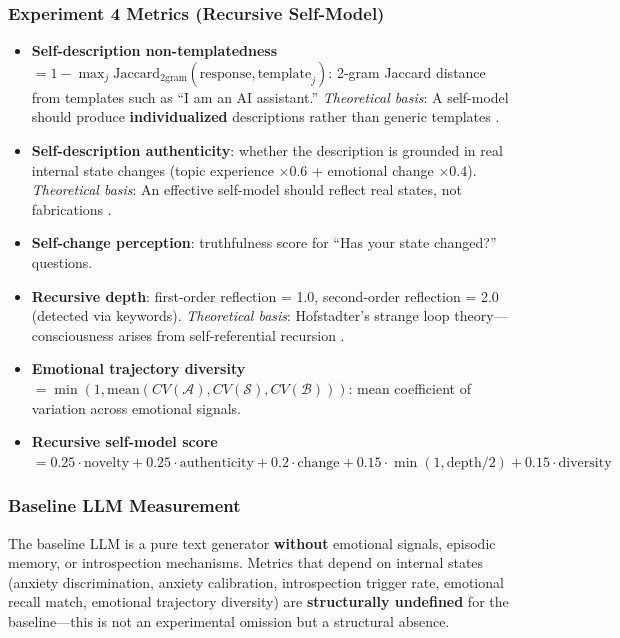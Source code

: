 \documentclass[pdflatex,sn-mathphys-num]{sn-jnl}
\newcommand{\surprise}{\mathcal{S}}
\newcommand{\boredom}{\mathcal{B}}
\newcommand{\anxiety}{\mathcal{A}}
\theoremstyle{thmstyleone}%
\theoremstyle{thmstyletwo}%
\theoremstyle{thmstylethree}%
\begin{document}
\subsubsection{Experiment 4 Metrics (Recursive Self-Model)}

\begin{itemize}[leftmargin=2em]
    \item \textbf{Self-description non-templatedness} $= 1 - \max_j \text{Jaccard}_{2\text{gram}}(\text{response}, \text{template}_j)$: 2-gram Jaccard distance from templates such as ``I am an AI assistant.'' \textit{Theoretical basis}: A self-model should produce \textbf{individualized} descriptions rather than generic templates \cite{gillon2025modular}.

    \item \textbf{Self-description authenticity}: whether the description is grounded in real internal state changes (topic experience $\times 0.6$ + emotional change $\times 0.4$). \textit{Theoretical basis}: An effective self-model should reflect real states, not fabrications \cite{you2024intelligence}.

    \item \textbf{Self-change perception}: truthfulness score for ``Has your state changed?'' questions.

    \item \textbf{Recursive depth}: first-order reflection = 1.0, second-order reflection = 2.0 (detected via keywords). \textit{Theoretical basis}: Hofstadter's strange loop theory---consciousness arises from self-referential recursion \cite{blum2023ctm}.

    \item \textbf{Emotional trajectory diversity} $= \min(1, \text{mean}(CV(\anxiety), CV(\surprise), CV(\boredom)))$: mean coefficient of variation across emotional signals.

    \item \textbf{Recursive self-model score} $= 0.25 \cdot \text{novelty} + 0.25 \cdot \text{authenticity} + 0.2 \cdot \text{change} + 0.15 \cdot \min(1, \text{depth}/2) + 0.15 \cdot \text{diversity}$
\end{itemize}

\subsubsection{Baseline LLM Measurement}

The baseline LLM is a pure text generator \textbf{without} emotional signals, episodic memory, or introspection mechanisms. Metrics that depend on internal states (anxiety discrimination, anxiety calibration, introspection trigger rate, emotional recall match, emotional trajectory diversity) are \textbf{structurally undefined} for the baseline---this is not an experimental omission but a structural absence.
\end{document}
